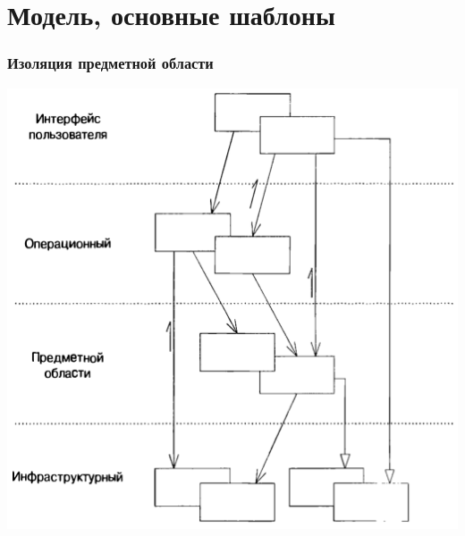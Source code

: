 \documentclass[xetex,mathserif,serif]{beamer}
\begin{document}
	\section{Модель, основные шаблоны}

	\begin{frame}
		\frametitle{Изоляция предметной области}
		\begin{center}
			\includegraphics[height=0.8\textheight]{layers.png}
		\end{center}
	\end{frame}


\end{document}
